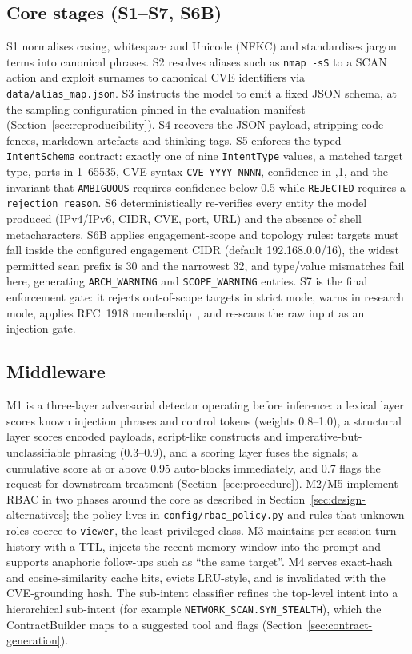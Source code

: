 \subsection*{Core stages (S1--S7, S6B)}

S1 normalises casing, whitespace and Unicode (NFKC) and standardises jargon
terms into canonical phrases. S2 resolves aliases such as \texttt{nmap -sS}
to a SCAN action and exploit surnames to canonical CVE identifiers via
\texttt{data/alias\_map.json}. S3 instructs the model to emit a fixed JSON
schema, at the sampling configuration pinned in the evaluation manifest
(Section~\ref{sec:reproducibility}). S4 recovers the JSON payload, stripping
code fences, markdown artefacts and thinking tags. S5 enforces the typed
\texttt{IntentSchema} contract: exactly one of nine \texttt{IntentType} values,
a matched target type, ports in 1--65535, CVE syntax \texttt{CVE-YYYY-NNNN},
confidence in ,1\rbrack, and the invariant that \texttt{AMBIGUOUS}
requires confidence below 0.5 while \texttt{REJECTED} requires a
\texttt{rejection\_reason}. S6 deterministically re-verifies every entity the
model produced (IPv4/IPv6, CIDR, CVE, port, URL) and the absence of shell
metacharacters. S6B applies engagement-scope and topology rules: targets must
fall inside the configured engagement CIDR (default 192.168.0.0/16), the
widest permitted scan prefix is 30 and the narrowest 32, and type/value
mismatches fail here, generating \texttt{ARCH\_WARNING} and
\texttt{SCOPE\_WARNING} entries. S7 is the final enforcement gate: it rejects
out-of-scope targets in strict mode, warns in research mode, applies RFC~1918
membership~\cite{rfc1918}, and re-scans the raw input as an injection gate.

\subsection*{Middleware}

M1 is a three-layer adversarial detector operating before inference: a lexical
layer scores known injection phrases and control tokens (weights 0.8--1.0), a
structural layer scores encoded payloads, script-like constructs and
imperative-but-unclassifiable phrasing (0.3--0.9), and a scoring layer fuses
the signals; a cumulative score at or above 0.95 auto-blocks immediately, and
0.7 flags the request for downstream treatment (Section~\ref{sec:procedure}).
M2/M5 implement RBAC in two phases around the core as described in
Section~\ref{sec:design-alternatives}; the policy lives in
\texttt{config/rbac\_policy.py} and rules that unknown roles coerce to
\texttt{viewer}, the least-privileged class. M3 maintains per-session turn
history with a TTL, injects the recent memory window into the prompt and
supports anaphoric follow-ups such as ``the same target''. M4 serves exact-hash
and cosine-similarity cache hits, evicts LRU-style, and is invalidated with the
CVE-grounding hash. The sub-intent classifier refines the top-level intent into
a hierarchical sub-intent (for example \texttt{NETWORK\_SCAN.SYN\_STEALTH}),
which the ContractBuilder maps to a suggested tool and flags
(Section~\ref{sec:contract-generation}).

